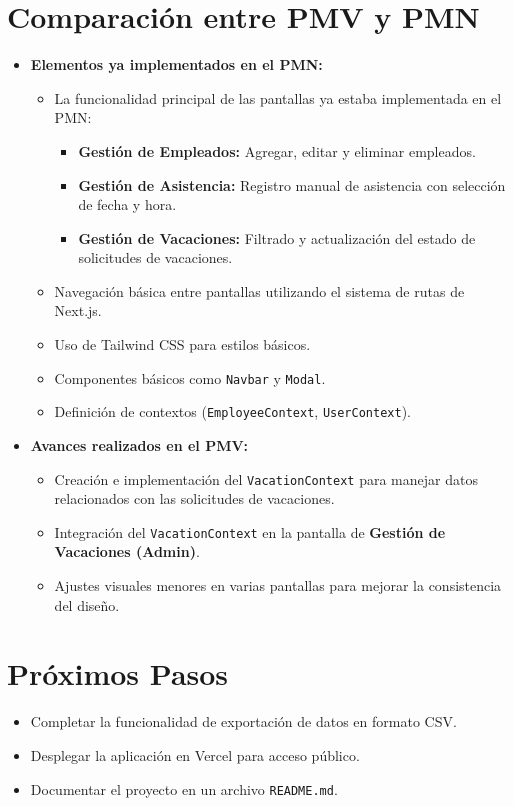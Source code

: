 \documentclass[12pt]{article}
\begin{document}
\section*{Comparación entre PMV y PMN}
\begin{itemize}
  \item \textbf{Elementos ya implementados en el PMN:}
  \begin{itemize}
    \item La funcionalidad principal de las pantallas ya estaba implementada en el PMN:
    \begin{itemize}
      \item \textbf{Gestión de Empleados:} Agregar, editar y eliminar empleados.
      \item \textbf{Gestión de Asistencia:} Registro manual de asistencia con selección de fecha y hora.
      \item \textbf{Gestión de Vacaciones:} Filtrado y actualización del estado de solicitudes de vacaciones.
    \end{itemize}
    \item Navegación básica entre pantallas utilizando el sistema de rutas de Next.js.
    \item Uso de Tailwind CSS para estilos básicos.
    \item Componentes básicos como \texttt{Navbar} y \texttt{Modal}.
    \item Definición de contextos (\texttt{EmployeeContext}, \texttt{UserContext}).
  \end{itemize}
  \item \textbf{Avances realizados en el PMV:}
  \begin{itemize}
    \item Creación e implementación del \texttt{VacationContext} para manejar datos relacionados con las solicitudes de vacaciones.
    \item Integración del \texttt{VacationContext} en la pantalla de \textbf{Gestión de Vacaciones (Admin)}.
    \item Ajustes visuales menores en varias pantallas para mejorar la consistencia del diseño.
  \end{itemize}
\end{itemize}

\section*{Próximos Pasos}
\begin{itemize}
  \item Completar la funcionalidad de exportación de datos en formato CSV.
  \item Desplegar la aplicación en Vercel para acceso público.
  \item Documentar el proyecto en un archivo \texttt{README.md}.
\end{itemize}
\end{document}
